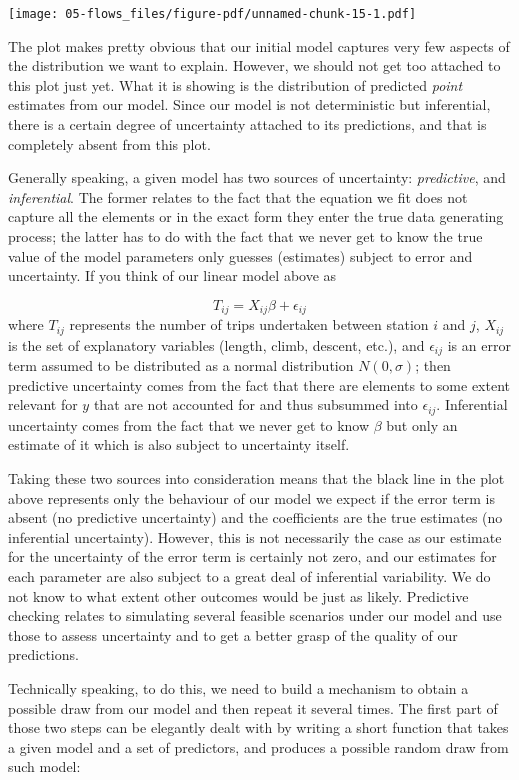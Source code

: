 \documentclass[
  letterpaper,
  DIV=11,
  numbers=noendperiod,
  oneside]{scrreprt}
\begin{document}
\texttt{[image: 05-flows\_files/figure-pdf/unnamed-chunk-15-1.pdf]}

The plot makes pretty obvious that our initial model captures very few
aspects of the distribution we want to explain. However, we should not
get too attached to this plot just yet. What it is showing is the
distribution of predicted \emph{point} estimates from our model. Since
our model is not deterministic but inferential, there is a certain
degree of uncertainty attached to its predictions, and that is
completely absent from this plot.

Generally speaking, a given model has two sources of uncertainty:
\emph{predictive}, and \emph{inferential}. The former relates to the
fact that the equation we fit does not capture all the elements or in
the exact form they enter the true data generating process; the latter
has to do with the fact that we never get to know the true value of the
model parameters only guesses (estimates) subject to error and
uncertainty. If you think of our linear model above as

\[
T_{ij} = X_{ij}\beta + \epsilon_{ij}
\] where \(T_{ij}\) represents the number of trips undertaken between
station \(i\) and \(j\), \(X_{ij}\) is the set of explanatory variables
(length, climb, descent, etc.), and \(\epsilon_{ij}\) is an error term
assumed to be distributed as a normal distribution \(N(0, \sigma)\);
then predictive uncertainty comes from the fact that there are elements
to some extent relevant for \(y\) that are not accounted for and thus
subsummed into \(\epsilon_{ij}\). Inferential uncertainty comes from the
fact that we never get to know \(\beta\) but only an estimate of it
which is also subject to uncertainty itself.

Taking these two sources into consideration means that the black line in
the plot above represents only the behaviour of our model we expect if
the error term is absent (no predictive uncertainty) and the
coefficients are the true estimates (no inferential uncertainty).
However, this is not necessarily the case as our estimate for the
uncertainty of the error term is certainly not zero, and our estimates
for each parameter are also subject to a great deal of inferential
variability. We do not know to what extent other outcomes would be just
as likely. Predictive checking relates to simulating several feasible
scenarios under our model and use those to assess uncertainty and to get
a better grasp of the quality of our predictions.

Technically speaking, to do this, we need to build a mechanism to obtain
a possible draw from our model and then repeat it several times. The
first part of those two steps can be elegantly dealt with by writing a
short function that takes a given model and a set of predictors, and
produces a possible random draw from such model:
\end{document}
